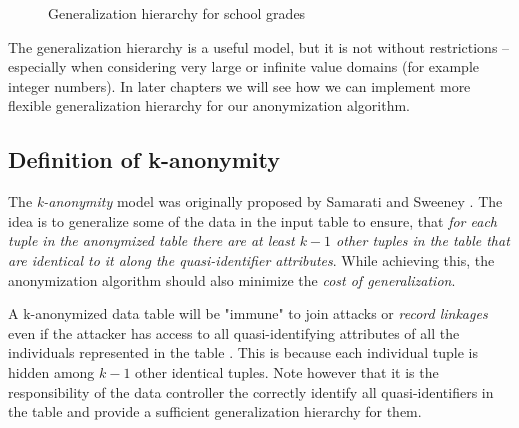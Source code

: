 \begin{figure}[H]
	\caption{Generalization hierarchy for school grades}
	\label{fig:grades-hierarchy}
\end{figure}

The generalization hierarchy is a useful model, but it is not without restrictions -- especially when considering very large or infinite value domains (for example integer numbers). In later chapters we will see how we can implement more flexible generalization hierarchy for our anonymization algorithm.

\subsection{Definition of k-anonymity} \label{sec:definition_of_anonymity}

The \textit{k-anonymity} model was originally proposed by Samarati and Sweeney \cite{samarati-sweeney} \cite{sweeney02}. The idea is to generalize some of the data in the input table to ensure, that \textit{for each tuple in the anonymized table there are at least \(k-1\) other tuples in the table that are identical to it along the quasi-identifier attributes}. While achieving this, the anonymization algorithm should also minimize the \textit{cost of generalization}.

A k-anonymized data table will be "immune" to join attacks or \textit{record linkages} even if the attacker has access to all quasi-identifying attributes of all the individuals represented in the table \cite{aggarwal}. This is because each individual tuple is hidden among \(k-1\) other identical tuples. Note however that it is the responsibility of the  data controller the correctly identify all quasi-identifiers in the table and provide a sufficient generalization hierarchy for them.

